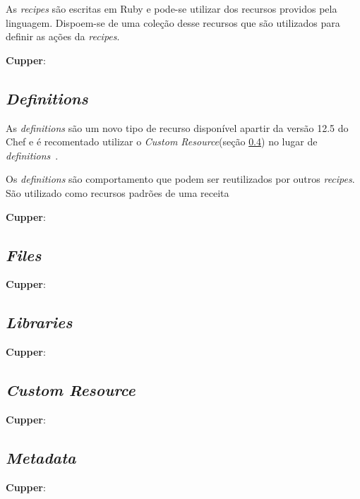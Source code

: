 As \textit{recipes} são escritas em Ruby e pode-se utilizar dos recursos providos
pela linguagem. Dispoem-se de uma coleção desse recursos que são utilizados
para definir as ações da \textit{recipes}.

\begin{minipage}{.90\textwidth}
  \label{code:recipe}
  \lstset{style=shell}
  
\end{minipage}

\textbf{Cupper}:

\subsection{\textit{Definitions}}
\label{sec:lev-rec-def}

As \textit{definitions} são um novo tipo de recurso disponível apartir da versão
12.5 do Chef e é recomentado utilizar o \textit{Custom Resource}(seção \ref{sec:lev-rec-cust})
no lugar de \textit{definitions}~\cite{chefdoc:2016}.

Os \textit{definitions} são comportamento que podem ser reutilizados por outros \textit{recipes}.
São utilizado como recursos padrões de uma receita

\textbf{Cupper}:

\subsection{\textit{Files}}

\textbf{Cupper}:

\subsection{\textit{Libraries}}

\textbf{Cupper}:

\subsection{\textit{Custom Resource}}
\label{sec:lev-rec-cust}

\textbf{Cupper}:

\subsection{\textit{Metadata}}

\textbf{Cupper}:

